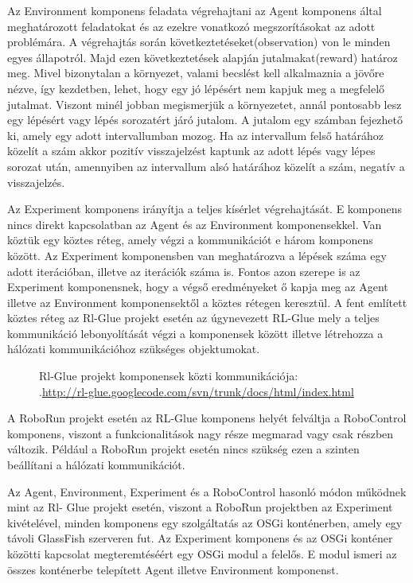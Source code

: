 	Az Environment komponens feladata végrehajtani az Agent komponens által meghatározott feladatokat és az ezekre vonatkozó megszorításokat az adott problémára. A végrehajtás során következtetéseket(observation) von le minden egyes állapotról. Majd ezen következtetések alapján jutalmakat(reward) határoz meg. Mivel bizonytalan a környezet,    valami becslést kell alkalmaznia a jövőre nézve, így kezdetben, lehet, hogy egy jó lépésért nem kapjuk meg a megfelelő jutalmat. Viszont minél jobban megismerjük a környezetet, annál pontosabb lesz egy lépésért vagy lépés sorozatért járó jutalom. A jutalom egy számban fejezhető ki, amely egy adott intervallumban mozog. Ha az intervallum felső határához közelít a szám akkor pozitív visszajelzést kaptunk az adott lépés vagy lépes sorozat után, amennyiben az intervallum alsó határához közelít a szám, negatív a visszajelzés.
	
	Az Experiment komponens irányítja a teljes kísérlet végrehajtását. E komponens nincs direkt kapcsolatban az Agent és az Environment komponensekkel. Van köztük egy köztes réteg, amely végzi a kommunikációt e három komponens között.  Az Experiment komponensben van meghatározva a lépések száma egy adott iterációban, illetve az iterációk száma is. Fontos azon szerepe is az Experiment komponensnek, hogy a végső eredményeket ő kapja meg az Agent illetve az Environment komponensektől a köztes rétegen keresztül.
A fent említett köztes réteg az Rl-Glue projekt esetén az úgynevezett RL-Glue mely a teljes kommunikáció lebonyolítását végzi a komponensek között illetve létrehozza a hálózati kommunikációhoz szükséges objektumokat.

\begin{figure}[t]
  \centering
  \caption[Példa képek beszúrására]%
  {Rl-Glue projekt komponensek közti kommunikációja:\\
  {\white .}\hfill\url{http://rl-glue.googlecode.com/svn/trunk/docs/html/index.html}}
  \label{fig:ALAP:sm1}
\end{figure}

A RoboRun projekt esetén az RL-Glue komponens helyét felváltja a RoboControl komponens, viszont a funkcionalitások nagy része megmarad vagy csak részben változik. Például a RoboRun projekt esetén nincs szükség ezen a szinten beállítani a hálózati kommunikációt.

	Az Agent, Environment, Experiment és a RoboControl hasonló módon működnek mint az Rl- Glue projekt esetén, viszont a RoboRun projektben az Experiment kivételével, minden komponens  egy szolgáltatás az OSGi konténerben, amely egy távoli GlassFish\citep{glassfish} szerveren fut. Az Experiment komponens és az OSGi konténer közötti kapcsolat megteremtéséért egy OSGi modul a felelős. E modul ismeri az összes konténerbe telepített Agent illetve Environment komponenst.
	
